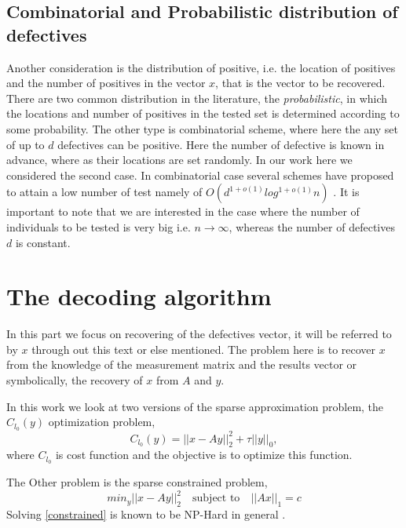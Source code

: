 \subsection{Combinatorial and Probabilistic distribution of defectives}
Another consideration is the distribution of positive, i.e. the location of positives and the number of positives in the vector $ x $, that is the vector to be recovered. There are two common distribution in the literature, the \textit{probabilistic}, in which the locations and number of positives in the tested set is determined according to some probability. The other type is combinatorial scheme, where here the any set of up to $ d $ defectives can be positive. Here the number of defective is known in advance, where as their locations are set randomly. In our work here we considered the second case. In combinatorial case several schemes have proposed to attain a low number of test namely of $ O(d^{1+o(1)} log^{1+o(1)} n) $ \cite{IEEE}. It is important to note that we are interested in the case where the number of individuals to be tested is very big i.e. $ n \rightarrow \infty$, whereas the number of defectives $ d $ is constant. 

\section{The decoding algorithm} 

In this part we focus on recovering of the defectives vector, it will be referred to by  $ x $ through out this text or else mentioned. The problem here is to recover $ x $ from the knowledge of the measurement matrix and the results vector or symbolically, the recovery of $ x $ from $ A $ and $ y $. 

In this work we look at two versions of the sparse approximation problem, the $ C_{l_0}(y) $ optimization problem, \begin{equation}\label{key}
C_{l_0}(y) = ||x-Ay||_{2}^{2} + \tau ||y||_0,
\end{equation} where $ C_{l_0} $ is cost function and the objective is to optimize this function.

The Other problem is the sparse constrained problem, \begin{equation}\label{constrained}
min_y ||x - Ay||_{2}^{2} \quad \text{subject to} \quad ||Ax||_1 = c
\end{equation} Solving \ref{constrained} is known to be NP-Hard in general \cite{bluemensath}.     

 

